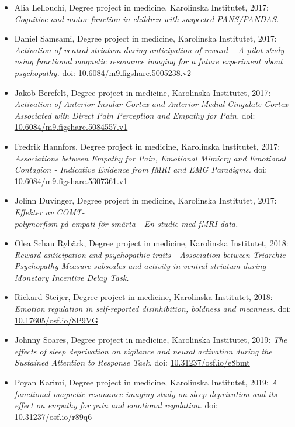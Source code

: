 \documentclass[10pt]{article}
\begin{document}
\begin{itemize}[nolistsep]
\begin{itemize}[nolistsep]
	\item Alia Lellouchi, Degree project in medicine, Karolinska Institutet, 2017: \emph{Cognitive and motor function in children with suspected PANS/PANDAS.}
	\item Daniel Samsami, Degree project in medicine, Karolinska Institutet, 2017: \emph{Activation of ventral striatum during anticipation of reward – A pilot study using functional magnetic resonance imaging for a future experiment about psychopathy.} doi: \href{https://doi.org/10.6084/m9.figshare.5005238.v2}{10.6084/m9.figshare.5005238.v2} 
	\item Jakob Berefelt, Degree project in medicine, Karolinska Institutet, 2017: \emph{Activation of Anterior Insular Cortex and Anterior Medial Cingulate Cortex Associated with Direct Pain Perception and Empathy for Pain.} doi: \href{https://doi.org/10.6084/m9.figshare.5084557.v1}{10.6084/m9.figshare.5084557.v1} 
	\item Fredrik Hannfors, Degree project in medicine, Karolinska Institutet, 2017: \emph{Associations between Empathy for Pain, Emotional Mimicry and Emotional Contagion - Indicative Evidence from fMRI and EMG Paradigms.} doi: \href{https://doi.org/10.6084/m9.figshare.5307361.v1}{10.6084/m9.figshare.5307361.v1} 
	\item Jolinn Duvinger, Degree project in medicine, Karolinska Institutet, 2017: \emph{Effekter av COMT-\\
polymorfism på empati för smärta - En studie med fMRI-data.}
	\item Olea Schau Rybäck, Degree project in medicine, Karolinska Institutet, 2018: \emph{Reward anticipation and psychopathic traits - Association between Triarchic Psychopathy Measure subscales and activity in ventral striatum during Monetary Incentive Delay Task.}
	\item Rickard Steijer, Degree project in medicine, Karolinska Institutet, 2018: \emph{Emotion regulation in self-reported disinhibition, boldness and meanness.} doi: \href{https://doi.org/10.17605/OSF.IO/8P9VG}{10.17605/osf.io/8P9VG} 
	\item Johnny Soares, Degree project in medicine, Karolinska Institutet, 2019: \emph{The effects of sleep deprivation on vigilance and neural activation during the Sustained Attention to Response Task.} doi: \href{https://doi.org/10.31237/osf.io/e8bmt}{10.31237/osf.io/e8bmt} 
	\item Poyan Karimi, Degree project in medicine, Karolinska Institutet, 2019: \emph{A functional magnetic resonance imaging study on sleep deprivation and its effect on empathy for pain and emotional regulation.} doi: \href{https://doi.org/10.31237/osf.io/r89q6}{10.31237/osf.io/r89q6} 

\end{itemize}
\end{itemize}
\end{document}
